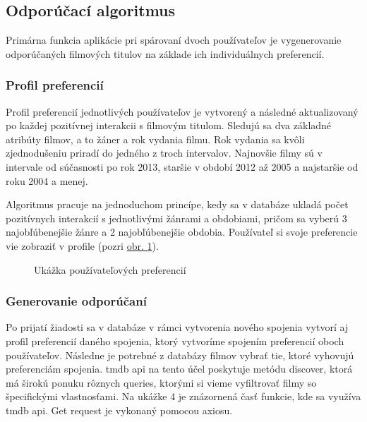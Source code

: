 \subsection{Odporúčací algoritmus}
Primárna funkcia aplikácie pri spárovaní dvoch používateľov je vygenerovanie odporúčaných filmových titulov na základe ich individuálnych preferencií.  
\subsubsection{Profil preferencií}
Profil preferencií jednotlivých používateľov je vytvorený a následné aktualizovaný po každej pozitívnej interakcii s filmovým titulom. Sledujú sa dva základné atribúty filmov, a to žáner a rok vydania filmu. Rok vydania sa kvôli zjednodušeniu priradí do jedného z troch intervalov. Najnovšie filmy sú v intervale od súčasnosti po rok 2013, staršie v období 2012 až 2005 a najstaršie od roku 2004 a menej.

Algoritmus pracuje na jednoduchom princípe, kedy sa v databáze ukladá počet pozitívnych interakcií s jednotlivými žánrami a obdobiami, pričom sa vyberú 3 najobľúbenejšie žánre a 2 najobľúbenejšie obdobia. Používateľ si svoje preferencie vie zobraziť v profile (pozri \hyperref[userprofile]{obr. \ref{userprofile}}).
\begin{figure}[hbt!]
  \centering   
  \def\stackalignment{c}
           \scriptsize
	\caption{Ukážka používateľových preferencií}  
  \label{userprofile}
\end{figure}

\subsubsection{Generovanie odporúčaní}
Po prijatí žiadosti sa v databáze v rámci vytvorenia nového spojenia vytvorí aj profil preferencií daného spojenia, ktorý vytvoríme spojením preferencií oboch používateľov. Následne je potrebné z databázy filmov vybrať tie, ktoré vyhovujú preferenciám spojenia. \acrshort{tmdb} \acrshort{api} na tento účel poskytuje metódu discover, ktorá má širokú ponuku rôznych queries, ktorými si vieme vyfiltrovať filmy so špecifickými vlastnosťami. Na ukážke 4 je znázornená časť funkcie, kde sa využíva \acrshort{tmdb} \acrshort{api}. Get request je vykonaný pomocou axiosu.

